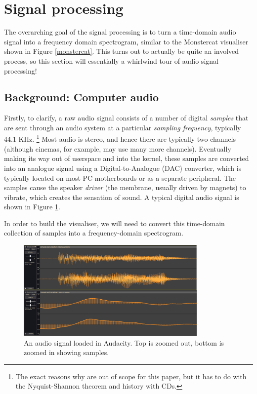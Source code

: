 \documentclass[11pt]{article}
\begin{document}
\clearpage
\section{Signal processing}
The overarching goal of the signal processing is to turn a time-domain audio signal into a frequency domain
spectrogram, similar to the Monstercat visualiser shown in Figure \ref{monstercat}. This turns out to actually
be quite an involved process, so this section will essentially a whirlwind tour of audio signal processing!

\subsection{Background: Computer audio}
Firstly, to clarify, a raw audio signal consists of a number of digital \textit{samples} that are sent through
an audio system at a particular \textit{sampling frequency}, typically 44.1 KHz.
\footnote{The exact reasons why are out of scope for this paper, but it has to do with the Nyquist-Shannon
theorem and history with CDs.}
Most audio is stereo, and hence there are typically two channels (although cinemas, for example, may use many
more channels). Eventually making its way out of userspace and into the kernel, these samples are converted
into an analogue signal using a Digital-to-Analogue (DAC) converter, which is typically located on most PC
motherboards or as a separate peripheral. The samples cause the speaker \textit{driver} (the membrane, usually
driven by magnets) to vibrate, which creates the sensation of sound. A typical digital audio signal is shown
in Figure \ref{fig:audiosignal}.

In order to build the visualiser, we will need to convert this time-domain collection of samples into a
frequency-domain spectrogram.

\begin{figure}[H]
\centering
\includegraphics[width=350px]{img/audiosignal.png}
\caption{An audio signal loaded in Audacity. Top is zoomed out, bottom is zoomed in showing samples.}
\label{fig:audiosignal}
\end{figure}
\end{document}
